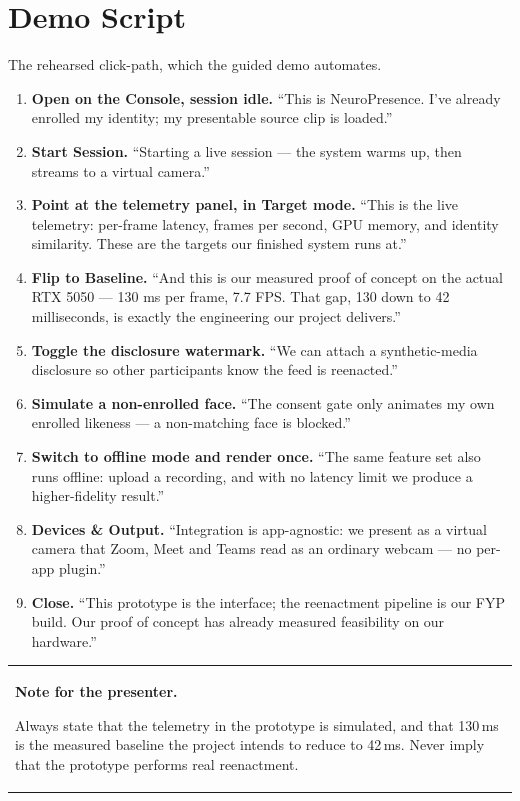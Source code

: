 \documentclass[11pt,a4paper]{report}
\newenvironment{npnote}[1]
  {\par\medskip\noindent\begin{tabularx}{\linewidth}{|>{\hspace{4pt}}X<{\hspace{4pt}}|}
   \hline\rule{0pt}{3ex}\textbf{#1}\par\medskip}
  {\par\medskip\hline\end{tabularx}\par\medskip}
\begin{document}
\chapter{Demo Script}

The rehearsed click-path, which the guided demo automates.

\begin{enumerate}\itemsep4pt
  \item \textbf{Open on the Console, session idle.} ``This is NeuroPresence.
    I've already enrolled my identity; my presentable source clip is loaded.''
  \item \textbf{Start Session.} ``Starting a live session --- the system warms
    up, then streams to a virtual camera.''
  \item \textbf{Point at the telemetry panel, in Target mode.} ``This is the
    live telemetry: per-frame latency, frames per second, GPU memory, and
    identity similarity. These are the targets our finished system runs at.''
  \item \textbf{Flip to Baseline.} ``And this is our measured proof of concept
    on the actual RTX 5050 --- 130 ms per frame, 7.7 FPS. That gap, 130 down to
    42 milliseconds, is exactly the engineering our project delivers.''
  \item \textbf{Toggle the disclosure watermark.} ``We can attach a
    synthetic-media disclosure so other participants know the feed is
    reenacted.''
  \item \textbf{Simulate a non-enrolled face.} ``The consent gate only animates
    my own enrolled likeness --- a non-matching face is blocked.''
  \item \textbf{Switch to offline mode and render once.} ``The same feature set
    also runs offline: upload a recording, and with no latency limit we produce
    a higher-fidelity result.''
  \item \textbf{Devices \& Output.} ``Integration is app-agnostic: we present
    as a virtual camera that Zoom, Meet and Teams read as an ordinary webcam
    --- no per-app plugin.''
  \item \textbf{Close.} ``This prototype is the interface; the reenactment
    pipeline is our FYP build. Our proof of concept has already measured
    feasibility on our hardware.''
\end{enumerate}

\begin{npnote}{Note for the presenter.}
Always state that the telemetry in the prototype is simulated, and that
130\,ms is the measured baseline the project intends to reduce to 42\,ms.
Never imply that the prototype performs real reenactment.
\end{npnote}
\end{document}
